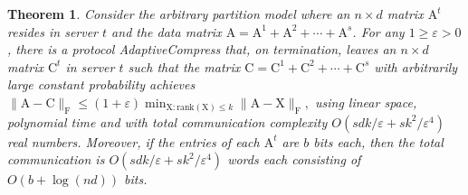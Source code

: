 \documentclass[11pt]{article}
\newcommand{\FNorm }[1]{\mbox{}\|#1\|_\mathrm{F}  }
\newtheorem{theorem}{Theorem}
\newcommand{\mat}[1]{{\ensuremath{\bm{\mathrm{#1}}}}}
\def\matA{\mat{A}}
\def\matC{\mat{C}}
\def\matX{\mat{X}}
\newcommand{\eps}{\varepsilon}
\begin{document}
\begin{theorem}\label{thm:low-rank-arbitrary}
Consider the arbitrary partition model where an $n\times d$ matrix $\matA^t$ resides in server $t$ and the data matrix
$\matA=\matA^1+\matA^2+\cdots +\matA^s$.
For any $1 \ge \eps > 0$, there is a protocol {\sc AdaptiveCompress} that, on termination, leaves an
$n\times d$ matrix $\matC^t$ in server $t$ such that the matrix $\matC=\matC^1+\matC^2+\cdots +\matC^s$ 
with arbitrarily large constant probability achieves
$
\FNorm{\matA-\matC} \le (1+\eps) \min_{\matX: \text {rank}(\matX)\leq k} \FNorm{\matA-\matX},$
using linear space, polynomial time and with total communication complexity $O(sdk/\eps + sk^2/\eps^4)$ real numbers.
Moreover, if the entries of each $\matA^t$
are $b$ bits each, then the total communication is $O(sdk/\eps + sk^2/\eps^4)$ words each consisting of $O(b + \log(nd))$ bits.
\end{theorem}
\end{document}
